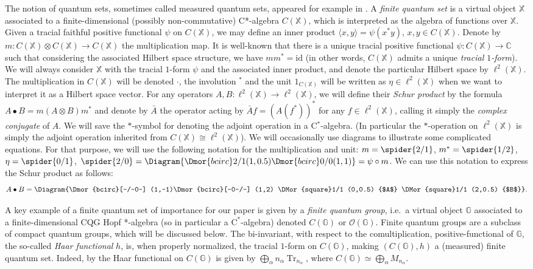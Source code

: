 \documentclass[12pt]{amsart}
\newcommand{\op}[1]{\operatorname{#1}}
\theoremstyle{definition}
\theoremstyle{definition}
\theoremstyle{definition}
\theoremstyle{definition}
\newcommand{\id}{\mathrm{id}}
\newcommand{\G}{\mathbb{G}}
\newcommand{\X}{\mathbb{X}}
\newcommand{\C}{\mathbb{C}}
\newcommand{\cO}{\mathcal{O}}
\newcommand{\Cst}{\textrm{C}^\ast}
\numberwithin{equation}{section}
\begin{document}
The notion of quantum sets, sometimes called measured quantum sets, appeared for example in \cite{MRV18}. A \emph{finite quantum set} is a virtual object $\X$ associated to a finite-dimensional (possibly non-commutative) C*-algebra $C(\X)$, which is interpreted as the algebra of functions over $\X$. Given a tracial faithful positive functional $\psi$ on $C(\X)$, we may define an inner product $\langle x,y\rangle=\psi(x^*y)$, $x,y \in C(\X)$. Denote by  $m\colon C(\X)\otimes C(\X)\to C(\X)$  the multiplication map. It is well-known that there is a unique tracial positive functional $\psi:C(\X) \to \C$ such that considering the associated Hilbert space structure, we have $mm^*=\id$ (in other words, $C(\X)$ admits a unique \emph{tracial $1$-form}). We will always consider $\X$ with the tracial $1$-form $\psi$ and the associated inner product, and denote the particular Hilbert space by $\ell^2(\X)$. The multiplication in $C(\X)$ will be denoted $\cdot$, the involution $^*$ and the unit $1_{C(\X)}$ will be written as $\eta\in \ell^2(\X)$ when we want to interpret it as a Hilbert space vector. For any operators $A,B\colon \ell^2(\X)\to \ell^2(\X)$, we will define their \emph{Schur product} by the formula  $A\bullet B=m(A\otimes B)m^*$   and denote by $\bar A$ the operator acting by $\bar Af=(A( f^*))^*$ for any $f\in \ell^2(\X)$, calling it simply the \emph{complex conjugate} of $A$. We will save the $*$-symbol for denoting the adjoint operation in a C$^\ast$-algebra.  (In particular the $\ast$-operation on $\ell^2(\X)$ is simply the adjoint operation inherited from $C(\X) \cong \ell^2(\X)$). We will occasionally use diagrams to illustrate some complicated equations. For that purpose, we will use the following notation for the multiplication and unit: $m=\spider{2/1}$, $m^*=\spider{1/2}$, $\eta=\spider{0/1}$, $\spider{2/0}=\Diagram{\Dmor{bcirc}2/1 (1,0.5) \Dmor{bcirc}0/0 (1,1)}=\psi\circ m$. We can use this notation to express the Schur product as follows:
$$A\bullet B=\Diagram{\Dmor{bcirc}[-/-0-] (1,-1)\Dmor{bcirc}[-0-/-] (1,2) \DMor{square}1/1 (0,0.5) {$A$} \DMor {square}1/1 (2,0.5) {$B$}}.$$

A key example of a finite quantum set of importance for our paper is given by a \emph{finite quantum group}, i.e.\ a virtual object $\G$ associated to a finite-dimensional CQG Hopf *-algebra (so in particular a $\Cst$-algebra) denoted $C(\G)$ or $\cO(\G)$. Finite quantum groups are a subclass of compact quantum groups, which will be discussed below. The bi-invariant, with respect to the comultiplication, positive-functional of $\G$, the so-called \emph{Haar functional} $h$, is, when properly normalized, the tracial $1$-form on $C(\G)$, making $(C(\G), h)$ a (measured) finite quantum set. Indeed, by \cite[Proposition A 2.2]{Wor87} the Haar functional on $C(\G)$ is given by $\bigoplus_{\alpha} n_{\alpha} \op{Tr}_{n_{\alpha}}$, where $C(\G)\simeq \bigoplus_{\alpha} M_{n_{\alpha}}$.
\end{document}

